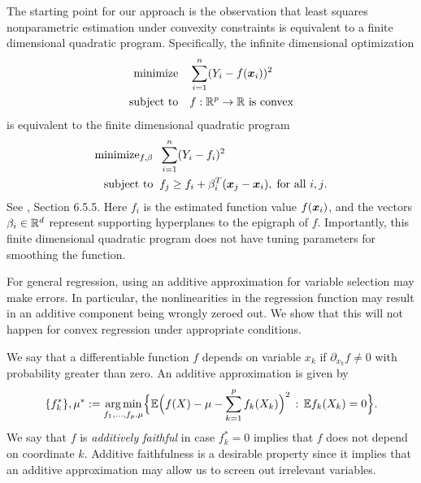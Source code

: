 The starting point for our approach is the observation that least squares
nonparametric estimation under convexity constraints is equivalent to
a finite dimensional quadratic program.  Specifically, the infinite
dimensional optimization 
\begin{align}
\begin{split}
\text{minimize} & \quad \sum_{i=1}^n (Y_i - f(\mbox{\boldmath $x$}_i))^2 \\
\text{subject to} &  \quad f:{\mathbb R}^p\rightarrow{\mathbb R}\ \text{is
  convex}
\end{split}
\end{align}
is equivalent to the finite dimensional quadratic
program 
\begin{align}
\label{eq:convreg}
\begin{split}
\text{minimize}_{f, \beta} & \;\; \sum_{i=1}^n (Y_i - f_i)^2 \\
\text{subject to} & \;\; f_j \geq f_i + \beta_i^T (\mbox{\boldmath $x$}_j-\mbox{\boldmath $x$}_i),\; \text{for
    all $i,j$}.
\end{split}
\end{align}
See \cite{Boyd04}, Section 6.5.5.
Here $f_i$ is the estimated function value $f(\mbox{\boldmath $x$}_i)$, and the vectors
$\beta_i \in {\mathbb R}^d$ represent supporting hyperplanes to the
epigraph of $f$.  Importantly, this finite dimensional quadratic program does
not have tuning parameters for smoothing the function. 

For general regression, using an additive approximation for variable
selection may make errors.  In particular, the nonlinearities in the
regression function may result in an additive component being wrongly
zeroed out.  We show that this will not happen for convex regression
under appropriate conditions.

We say that a differentiable function $f$ depends on variable $x_k$ if
$\partial_{x_k} f \neq 0$ with probability greater than zero.  An additive approximation is given by
\begin{equation}
\{f_k^*\}, \mu^* := \mathop{\text{\rm arg\,min}}_{f_1,\ldots, f_p, \mu} \Bigl\{ 
             {\mathbb E} \Bigl( f(X) - \mu - \sum_{k=1}^p f_k(X_k)\Bigr)^2 
         \,:\, {\mathbb E} f_k(X_k) = 0 \Bigr\}.
\end{equation}
We say that $f$ is \textit{additively faithful} in case $f^*_k = 0$
implies that $f$ does not depend on coordinate $k$.
Additive faithfulness is a desirable property
since it implies that an additive approximation may allow us to 
screen out irrelevant variables.

